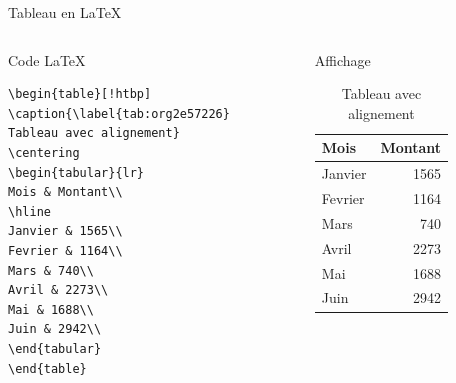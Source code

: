 \documentclass[presentation,t]{beamer}
\begin{document}
\begin{frame}[fragile,label={sec:org03621e9}]{Tableau en \LaTeX{}}
 \begin{columns}
\begin{column}{0.48\columnwidth}
Code \LaTeX{}

\lstset{language=[LaTeX]TeX,label= ,caption= ,captionpos=b,numbers=none}
\begin{lstlisting}
\begin{table}[!htbp]
\caption{\label{tab:org2e57226}
Tableau avec alignement}
\centering
\begin{tabular}{lr}
Mois & Montant\\
\hline
Janvier & 1565\\
Fevrier & 1164\\
Mars & 740\\
Avril & 2273\\
Mai & 1688\\
Juin & 2942\\
\end{tabular}
\end{table}
\end{lstlisting}

\pause{}
\end{column}

\begin{column}{0.48\columnwidth}
Affichage

\begin{mdframed}
\begin{table}[!htbp]
\caption{\label{achats-par-mois}Tableau avec alignement}
\centering
\begin{tabular}{lr}
Mois & Montant\\
\hline
Janvier & 1565\\
Fevrier & 1164\\
Mars & 740\\
Avril & 2273\\
Mai & 1688\\
Juin & 2942\\
\end{tabular}
\end{table}

\end{mdframed}
\end{column}
\end{columns}
\end{frame}
\end{document}
